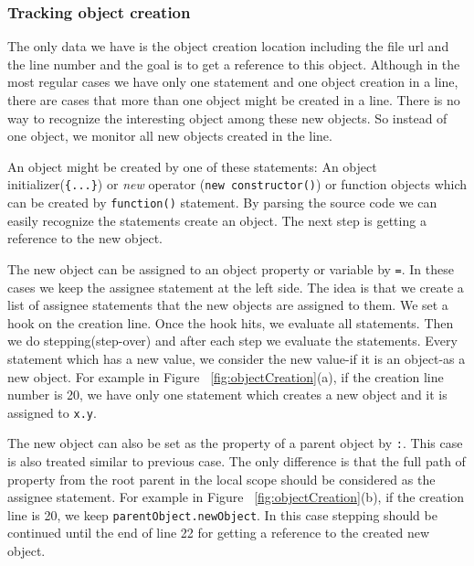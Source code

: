 \documentclass[preprint]{sigplanconf}
\begin{document}
 
\subsubsection{Tracking object creation}
The only data we have is the object creation location including the file url and the line number and the goal is to get a reference to this object. Although in the most regular cases we have only one statement and one object creation in a line, there are cases that more than one object might be created in a line. There is no way to recognize the interesting object among these new objects. So instead of one object, we monitor all new objects created in the line. 

An object might be created by one of these statements: An object initializer(\texttt{\{...\}}) or \textit{new} operator (\texttt{new constructor()}) or function objects which can be created by \texttt{function()} statement. By parsing the source code we can easily recognize the statements create an object. The next step is getting a reference to the new object. 

The new object can be assigned to an object property or variable by \texttt{=}. In these cases we keep the assignee statement at the left side. The idea is that we create a list of assignee statements that the new objects are assigned to them. We set a hook on the creation line. Once the hook hits, we evaluate all statements. Then we do stepping(step-over) and after each step we evaluate the statements. Every statement which has a new value, we consider the new value-if it is an object-as a new object. For example in Figure ~\ref{fig:objectCreation}(a), if the creation line number is 20, we have only one statement which creates a new object and it is assigned to \texttt{x.y}. 

The new object can also be set as the property of a parent object by \texttt{:}. This case is also treated similar to previous case. The only difference is that the full path of property from the root parent in the local scope should be considered as the assignee statement. For example in Figure ~\ref{fig:objectCreation}(b), if the creation line is 20, we keep \texttt{parentObject.newObject}. In this case stepping should be continued until the end of line 22 for getting a reference to the created new object. 
\end{document}
